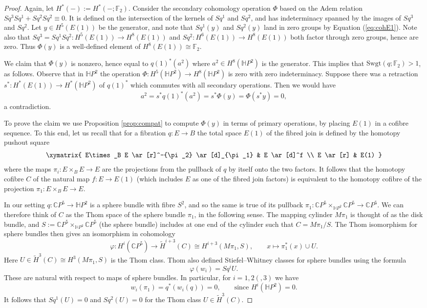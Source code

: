 \documentclass{amsart}
\theoremstyle{plain}
\theoremstyle{definition}
\newcommand{\C}{\mathbb{C}}
\newcommand{\Ha}{\mathbb{H}}
\newcommand{\F}{\mathbb{F}}
\def\Swgt{\mathrm{Swgt}}
\begin{document}
 \begin{proof}
 Again, let $H^*(-):=H^*(-;\F_2)$. Consider the secondary cohomology operation $\Phi$ based on the Adem relation $Sq^3Sq^1 + Sq^2 Sq^2\equiv 0$. It is defined on the intersection of the kernels of $Sq^1$ and $Sq^2$, and has indeterminacy spanned by the images of $Sq^3$ and $Sq^2$. Let $y\in H^5(E(1))$ be the generator, and note that $Sq^1(y)$ and $Sq^2(y)$ land in zero groups by Equation (\ref{eq:cohE1}). Note also that $Sq^3=Sq^1Sq^2:H^5(E(1))\to H^8(E(1))$ and $Sq^2:H^6(E(1))\to H^8(E(1))$ both factor through zero groups, hence are zero. Thus $\Phi(y)$ is a well-defined element of $H^8(E(1))\cong \F_2$.

We claim that $\Phi(y)$ is nonzero, hence equal to $q(1)^*(a^2)$ where $a^2\in H^8(\Ha P^2)$ is the generator. This implies that $\Swgt(q;\F_2)>1$, as follows. Observe that in $\Ha P^2$ the operation $\Phi: H^5(\Ha P^2)\to H^8(\Ha P^2)$ is zero with zero indeterminacy. Suppose there was a retraction $s^*: H^*(E(1))\to H^*(\Ha P^2)$ of $q(1)^*$ which commutes with all secondary operations. Then we would have
\[
a^2 = s^*q(1)^*(a^2) = s^*\Phi(y) = \Phi(s^*y) = 0,
\]
a contradiction.

To prove the claim we use Proposition \ref{prop:compat} to compute $\Phi(y)$ in terms of primary operations, by placing $E(1)$ in a cofibre sequence. To this end, let us recall that for a fibration $q:E\to B$ the total space $E(1)$ of the fibred join is defined by the homotopy pushout square
\[
\xymatrix{
E\times_B E \ar[r]^-{\pi_2} \ar[d]_{\pi_1} & E \ar[d]^f \\
E \ar[r] & E(1)
}
\]
where the maps $\pi_i:  E\times_B E\to E$ are the projections from the pullback of $q$ by itself onto the two factors. It follows that the homotopy cofibre $C$ of the natural map $f:E\to E(1)$ (which includes $E$ as one of the fibred join factors) is equivalent to the homotopy cofibre of the projection $\pi_1: E\times_B E\to E$. 

In our setting $q:\C P^5\to \Ha P^2$ is a sphere bundle with fibre $S^2$, and so the same is true of its pullback $\pi_1: \C P^5 \times_{\Ha P^2} \C P^5\to \C P^5$. We can therefore think of $C$ as the Thom space of the sphere bundle $\pi_1$, in the following sense. The mapping cylinder $M\pi_1$ is thought of as the disk bundle, and $S:=\C P^5 \times_{\Ha P^2} \C P^5$ (the sphere bundle) includes at one end of the cylinder such that $C=M\pi_1/S$. The Thom isomorphism for sphere bundles \cite{Thom} then gives an isomorphism in cohomology
\[
\varphi: H^i(\C P^5) \to \tilde{H}^{i+3}(C)\cong H^{i+3}(M\pi_1,S),\qquad x\mapsto \pi_1^*(x)\cup U.
\]
 Here $U\in \tilde{H}^3(C)\cong H^3(M\pi_1,S)$ is the Thom class. Thom also defined Stiefel--Whitney classes for sphere bundles using the formula
 \[
 \varphi(w_i)=Sq^i U.
 \]
 These are natural with respect to maps of sphere bundles. In particular, for $i=1,2(,3)$ we have 
 \[
 w_i(\pi_1)=q^*(w_i(q))=0,\qquad\mbox{since }H^i(\Ha P^2)=0.
 \]
 It follows that $Sq^1(U)=0$ and $Sq^2(U)=0$ for the Thom class $U\in \tilde{H}^3(C)$.
 

\end{proof}
\end{document}
